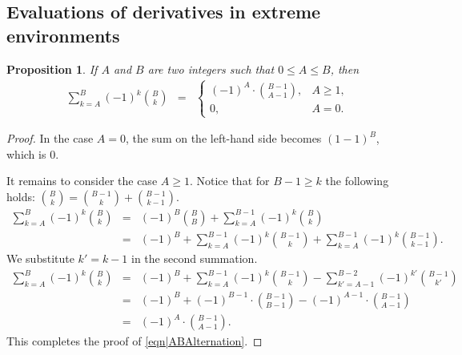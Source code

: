 \documentclass[reqno]{amsart}
\newtheorem{proposition}[theorem]{Proposition}
\begin{document}

 
 
   
 
 
   
   
   
 
 
\begin{appendix} 
 
\section{Evaluations of derivatives in extreme environments} \label{Appendix|EvaluationsInExtremeEnvironments}
 

 
\begin{proposition} If $A$ and $B$ are two integers such that $0\leq A\leq B$, then
\begin{eqnarray}
\sum_{k=A}^B(-1)^k\binom{B}{k}&=&\left\{\begin{array}{ll}(-1)^A\cdot \binom{B-1}{A-1},& A\geq 1,\\
0,& A=0.\end{array}\right.
\label{eqn|ABAlternation}
\end{eqnarray}
\end{proposition}
\begin{proof}
In the case $A=0$, the sum on the left-hand side becomes $(1-1)^B$, which is $0$. 

It remains to consider the case $A\geq 1$. 
Notice that for $B-1\geq k$ the following holds: $\binom{B}{k}=\binom{B-1}k+\binom{B-1}{k-1}$.
\begin{eqnarray*}
\sum_{k=A}^B(-1)^k\binom{B}{k}&=&
(-1)^B\binom BB+
\sum_{k=A}^{B-1}(-1)^k\binom{B}{k}\\
&=&
(-1)^B+
\sum_{k=A}^{B-1}(-1)^k\binom{B-1}{k}+\sum_{k=A}^{B-1}(-1)^k\binom{B-1}{k-1}.
\end{eqnarray*}
We substitute $k'=k-1$ in the second summation.
\begin{eqnarray*}
\sum_{k=A}^B(-1)^k\binom{B}{k} 
&=&
(-1)^B+
\sum_{k=A}^{B-1}(-1)^k\binom{B-1}{k}-\sum_{k'=A-1}^{B-2}(-1)^{k'}\binom{B-1}{k'}\\
&=&(-1)^B+(-1)^{B-1}\cdot\binom{B-1}{B-1}-(-1)^{A-1}\cdot\binom{B-1}{A-1}\\
&=&(-1)^A\cdot \binom{B-1}{A-1}.
\end{eqnarray*}
This completes the proof of \eqref{eqn|ABAlternation}.
\end{proof}



\end{appendix}
\end{document}

